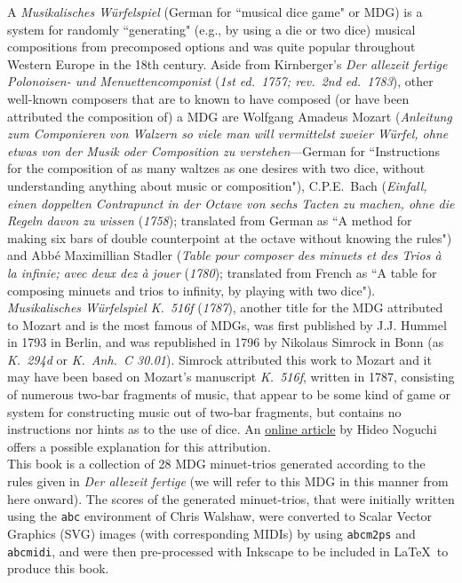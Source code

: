 \documentclass[a4paper,x11names,svgnames,10pt]{article}
\begin{document}
A {\it Musikalisches W\"{u}rfelspiel} (German for ``musical dice game" or MDG) is a system for randomly ``generating" (e.g., by using a die or two dice) musical compositions from precomposed options and was quite popular throughout Western Europe in the 18th century. Aside from Kirnberger's {\em Der allezeit fertige Polonoisen- und Menuettencomponist} ({\it 1st ed.\ 1757; rev.\ 2nd ed.\ 1783}), other well-known composers that are to known to have composed  (or have been attributed the composition of) a MDG are Wolfgang Amadeus Mozart ({\em Anleitung zum Componieren von Walzern so viele man will vermittelst zweier Würfel, ohne etwas von der Musik oder Composition zu verstehen}---German for ``Instructions for the composition of as many waltzes as one desires with two dice, without understanding anything about music or composition"), C.P.E.\ Bach ({\em Einfall, einen doppelten Contrapunct in der Octave von sechs Tacten zu machen, ohne die Regeln davon zu wissen} ({\it 1758}); translated from German as ``A method for making six bars of double counterpoint at the octave without knowing the rules") and Abb\'{e} Maximillian Stadler ({\em Table pour composer des minuets et des Trios \`{a} la infinie; avec deux dez \`{a} jouer} ({\it 1780}); translated from French as ``A table for composing minuets and trios to infinity, by playing with two dice"). \\

{\it Musikalisches W\"{u}rfelspiel K.\ 516f} ({\it 1787}), another title for the MDG attributed to Mozart and is the most famous of MDGs, was first published by J.J. Hummel in 1793 in Berlin, and was republished in 1796 by Nikolaus Simrock in Bonn (as {\em K.\ 294d} or {\em K.\ Anh.\ C 30.01}).  Simrock attributed this work to Mozart and it may have been based on Mozart's manuscript {\em K.\ 516f}, written in 1787, consisting of numerous two-bar fragments of music, that appear to be some kind of game or system for constructing music out of two-bar fragments, but contains no instructions nor hints as to the use of dice.  An \href{(http://www.asahi-net.or.jp/\~rb5h-ngc/e/k516f.htm}{online article} by Hideo Noguchi offers a possible explanation for this attribution. \\

This book is a collection of 28 MDG minuet-trios generated according to the rules given in {\it Der allezeit fertige} (we will refer to this MDG in this manner from here onward).  The scores of the generated minuet-trios, that were initially written using the \texttt{abc} environment of Chris Walshaw, were converted to Scalar Vector Graphics (SVG) images (with corresponding MIDIs) by using {\tt abcm2ps} and {\tt abcmidi}, and were then pre-processed with Inkscape to be included in \LaTeX\ to produce this book.
\end{document}
